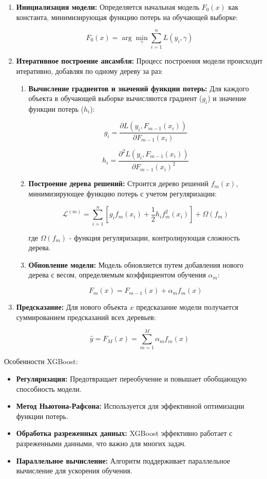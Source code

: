 \documentclass[12pt, a4paper]{extreport}
\begin{document}
\begin{enumerate}[label=\arabic*.]
    \item \textbf{Инициализация модели:}
          Определяется начальная модель $F_0(x)$ как константа, минимизирующая функцию потерь на обучающей выборке:

          $$F_0(x) = \arg \min_{\gamma} \sum_{i=1}^n L(y_i, \gamma)$$

    \item \textbf{Итеративное построение ансамбля:}
          Процесс построения модели происходит итеративно, добавляя по одному дереву за раз:
          \begin{enumerate}[label=\roman*.]
              \item \textbf{Вычисление градиентов и значений функции потерь:} Для каждого объекта в обучающей выборке вычисляются градиент ($g_i$) и значение функции потерь ($h_i$):

                    $$g_i = \frac{\partial L(y_i, F_{m-1}(x_i))}{\partial F_{m-1}(x_i)}$$

                    $$h_i = \frac{\partial^2 L(y_i, F_{m-1}(x_i))}{\partial F_{m-1}(x_i)^2}$$

              \item \textbf{Построение дерева решений:} Строится дерево решений $f_m(x)$, минимизирующее функцию потерь с учетом регуляризации:

                    $$\mathcal{L}^{(m)} = \sum_{i=1}^n \left[ g_i f_m(x_i) + \frac{1}{2} h_i f_m^2(x_i) \right] + \Omega(f_m)$$

                    где $\Omega(f_m)$ - функция регуляризации, контролирующая сложность дерева.

              \item \textbf{Обновление модели:} Модель обновляется путем добавления нового дерева с весом, определяемым коэффициентом обучения $\alpha_m$:

                    $$F_m(x) = F_{m-1}(x) + \alpha_m f_m(x)$$
          \end{enumerate}

    \item \textbf{Предсказание:}
          Для нового объекта $x$ предсказание модели получается суммированием предсказаний всех деревьев:

          $$\hat{y} = F_M(x) = \sum_{m=1}^M \alpha_m f_m(x)$$
\end{enumerate}

Особенности XGBoost:

\begin{itemize}
    \item \textbf{Регуляризация:} Предотвращает переобучение и повышает обобщающую способность модели.
    \item \textbf{Метод Ньютона-Рафсона:} Используется для эффективной оптимизации функции потерь.
    \item \textbf{Обработка разреженных данных:} XGBoost эффективно работает с разреженными данными, что важно для многих задач.
    \item \textbf{Параллельное вычисление:} Алгоритм поддерживает параллельное вычисление для ускорения обучения.
\end{itemize}
\end{document}
